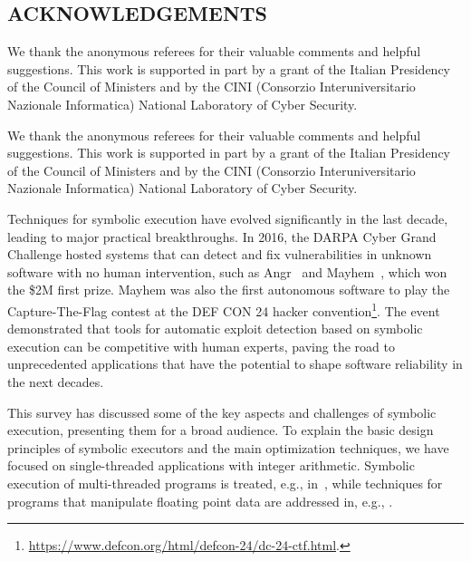 \subsection*{ACKNOWLEDGEMENTS}
We thank the anonymous referees for their valuable comments and helpful suggestions. This work is supported in part by a grant of the Italian Presidency of the Council of Ministers and by the CINI (Consorzio Interuniversitario Nazionale Informatica) National Laboratory of Cyber Security. %
\else
\begin{acks}
We thank the anonymous referees for their valuable comments and helpful suggestions. This work is supported in part by a grant of the Italian Presidency of the Council of Ministers and by the CINI (Consorzio Interuniversitario Nazionale Informatica) National Laboratory of Cyber Security. %
\end{acks}
\fi

\iffalse
Techniques for symbolic execution have evolved significantly in the last decade, leading to major practical breakthroughs. In 2016, the DARPA Cyber Grand Challenge hosted systems that can detect and fix vulnerabilities in unknown software with no human intervention, such as {\sc Angr}~\cite{ANGR-SSP16} and {\sc Mayhem}~\cite{MAYHEM-SP12}, which won the \$2M first prize. {\sc Mayhem} was also the first autonomous software to play the Capture-The-Flag contest at the DEF CON 24 hacker convention\footnote{\url{https://www.defcon.org/html/defcon-24/dc-24-ctf.html}.}. The event demonstrated that tools for automatic exploit detection based on symbolic execution can be competitive with human experts, paving the road to unprecedented applications %
that have the potential to shape software %
reliability in the next decades. 

This survey has discussed some of the key aspects and challenges of symbolic execution, presenting them for a broad audience. 
To explain the basic design principles of symbolic executors and the main optimization techniques, we have focused on single-threaded applications with integer arithmetic. Symbolic execution of multi-threaded programs is treated, e.g., 
{in~\cite{BGC-OOPSLA14,GKW-ESEC15}}, 
while techniques for programs that manipulate floating point data are addressed 
{in, e.g., \cite{RPW-SIGSOFT15}}.

